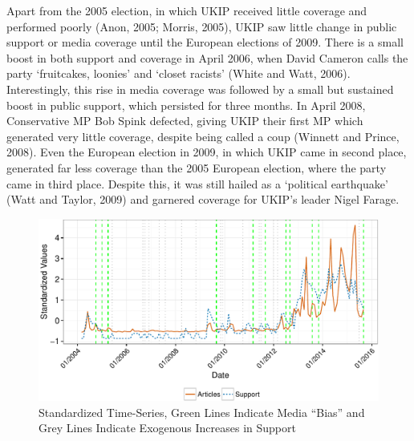 \documentclass[12pt,article]{article}
\begin{document}
Apart from the 2005 election, in which UKIP received little coverage and
performed poorly (Anon, 2005; Morris, 2005), UKIP saw little change in
public support or media coverage until the European elections of 2009.
There is a small boost in both support and coverage in April 2006, when
David Cameron calls the party `fruitcakes, loonies' and `closet racists'
(White and Watt, 2006). Interestingly, this rise in media coverage was
followed by a small but sustained boost in public support, which
persisted for three months. In April 2008, Conservative MP Bob Spink
defected, giving UKIP their first MP which generated very little
coverage, despite being called a coup (Winnett and Prince, 2008). Even
the European election in 2009, in which UKIP came in second place,
generated far less coverage than the 2005 European election, where the
party came in third place. Despite this, it was still hailed as a
`political earthquake' (Watt and Taylor, 2009) and garnered coverage for
UKIP's leader Nigel Farage.

\begin{figure}[htbp]
\centering
\includegraphics{ukip_media_files/figure-latex/unnamed-chunk-9-1.pdf}
\caption{Standardized Time-Series, Green Lines Indicate Media ``Bias''
and Grey Lines Indicate Exogenous Increases in Support}
\end{figure}
\end{document}
